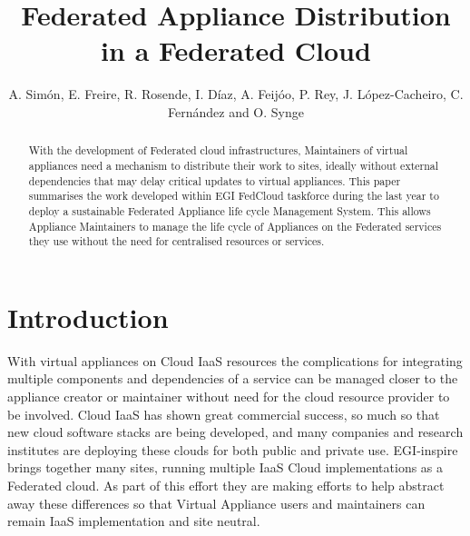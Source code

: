 \documentclass{llncs_Ibergrid2013}
\begin{document}
%
\frontmatter          %
%
\pagestyle{headings}  %
%
\mainmatter              %
%
\title{Federated Appliance Distribution in a Federated Cloud}
%
%
\author{A. Sim\'on, E. Freire, R. Rosende, I. D\'iaz, A. Feij\'oo, P. Rey, J. L\'opez-Cacheiro, C. Fern\'andez and O. Synge}
%
%
%




\maketitle              %

\begin{abstract}
With the development of Federated cloud infrastructures, Maintainers of virtual appliances need a mechanism to distribute their work to sites, ideally without external dependencies that may delay critical updates to virtual appliances. This paper summarises the work developed within EGI FedCloud taskforce during the last year to deploy a sustainable Federated Appliance life cycle Management System. This allows Appliance Maintainers to manage the life cycle of Appliances on the Federated services they use without the need for centralised resources or services.
\end{abstract}

%
\section{Introduction}
\label{sect-introduction}
%
With virtual appliances on Cloud IaaS resources the complications for integrating multiple components and dependencies of a service can be managed closer to the appliance creator or maintainer without need for the cloud resource provider to be involved. Cloud IaaS has shown great commercial success, so much so that new cloud software stacks are being developed, and many companies and research institutes are deploying these clouds for both public and private use. EGI-inspire brings together many sites, running multiple IaaS Cloud implementations as a Federated cloud. As part of this effort they are making efforts to help abstract away these differences so that Virtual Appliance users and maintainers can remain IaaS implementation and site neutral.
\end{document}
